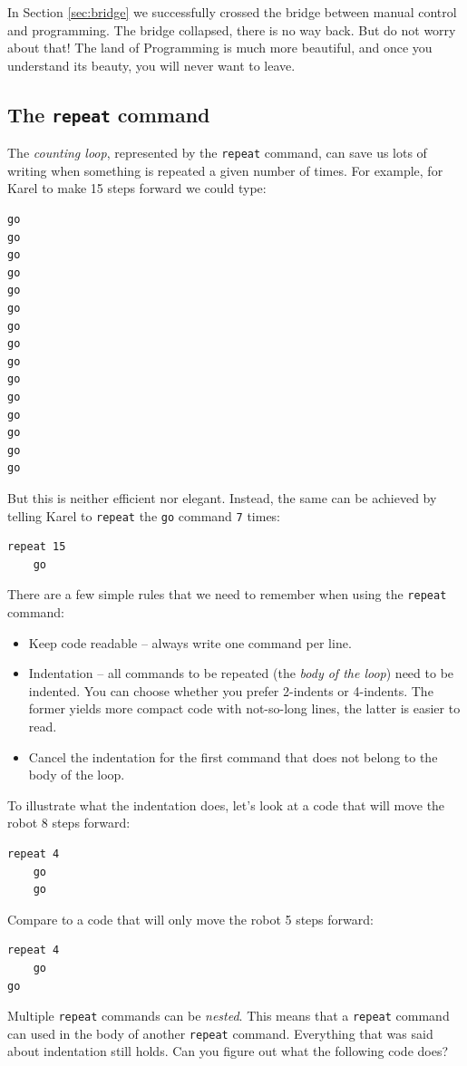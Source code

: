 \noindent
In Section \ref{sec:bridge} we successfully crossed the bridge between manual control 
and programming. The bridge collapsed, there is no way back. But do 
not worry about that! The land of Programming is much more beautiful,
and once you understand its beauty, you will never want to leave.


\subsection{The {\tt repeat} command}

The {\em counting loop}, represented by the {\tt repeat} command, can save 
us lots of writing when something is repeated a given number of times. 
For example, for Karel to make 15 steps forward we could type:

\begin{verbatim}
go
go
go
go
go
go
go
go
go
go
go
go
go
go
go
\end{verbatim}
But this is neither efficient nor elegant. Instead, the same can be
achieved by telling Karel to {\tt repeat} the {\tt go} command {\tt 7} times:

\begin{verbatim}
repeat 15
    go
\end{verbatim}
There are a few simple rules that we need to remember when using the {\tt repeat} command:

\begin{itemize}
\item Keep code readable -- always write one command per line.
\item Indentation -- all commands to be repeated (the {\em body of the loop}) need to be indented. You can
      choose whether you prefer 2-indents or 4-indents. The former yields more compact 
      code with not-so-long lines, the latter is easier to read. 
\item Cancel the indentation for the first command that does not belong to the body of the loop.
\end{itemize}
To illustrate what the indentation does, let's look at a code that will move the robot 8 steps forward:

\begin{verbatim}
repeat 4
    go
    go
\end{verbatim}
Compare to a code that will only move the robot 5 steps forward:

\begin{verbatim}
repeat 4
    go
go
\end{verbatim}
Multiple {\tt repeat} commands can be {\em nested}. This means that a {\tt repeat} command 
can used in the body of another {\tt repeat} command. Everything that was said about indentation 
still holds. Can you figure out what the following code does?


